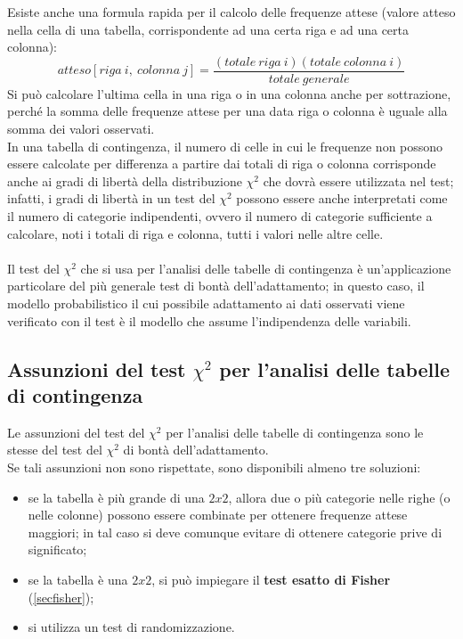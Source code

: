 \documentclass[10pt, draft]{book}
\begin{document}
Esiste anche una formula rapida per il calcolo delle frequenze attese (valore atteso nella cella di una tabella, corrispondente ad una certa riga e ad una certa colonna):
\begin{equation}
    atteso[riga\ i,\ colonna\ j] = \frac{(totale\ riga\ i)(totale\ colonna\ i)}{totale\ generale}
\end{equation}
Si può calcolare l'ultima cella in una riga o in una colonna anche per sottrazione, perché la somma delle frequenze attese per una data riga o colonna è uguale alla somma dei valori osservati.
\\
In una tabella di contingenza, il numero di celle in cui le frequenze non possono essere calcolate per differenza a partire dai totali di riga o colonna corrisponde anche ai gradi di libertà della distribuzione $\chi^2$ che dovrà essere utilizzata nel test; infatti, i gradi di libertà in un test del $\chi^2$ possono essere anche interpretati come il numero di categorie indipendenti, ovvero il numero di categorie sufficiente a calcolare, noti i totali di riga e colonna, tutti i valori nelle altre celle.
\\
\\
Il test del $\chi^2$ che si usa per l'analisi delle tabelle di contingenza è un'applicazione particolare del più generale test di bontà dell'adattamento; in questo caso, il modello probabilistico il cui possibile adattamento ai dati osservati viene verificato con il test è il modello che assume l'indipendenza delle variabili.

\subsection{Assunzioni del test \texorpdfstring{$\chi^2$}{Lg} per l'analisi delle tabelle di contingenza}
Le assunzioni del test del $\chi^2$ per l'analisi delle tabelle di contingenza sono le stesse del test del $\chi^2$ di bontà dell'adattamento.
\\
Se tali assunzioni non sono rispettate, sono disponibili almeno tre soluzioni:
\begin{itemize}
    \item se la tabella è più grande di una $2x2$, allora due o più categorie nelle righe (o nelle colonne) possono essere combinate per ottenere frequenze attese maggiori; in tal caso si deve comunque evitare di ottenere categorie prive di significato;
    \item se la tabella è una $2x2$, si può impiegare il \textbf{test esatto di Fisher} (\ref{secfisher});
    \item si utilizza un test di randomizzazione. %
\end{itemize}
\end{document}
